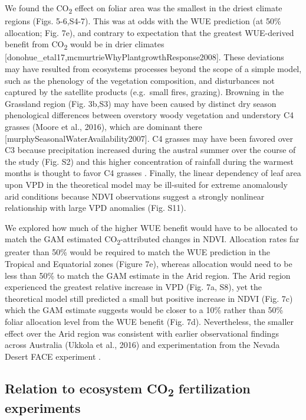 \documentclass[gc, manuscript]{copernicus}
\begin{document}
We found the CO\textsubscript{2} effect on foliar area was the smallest
in the driest climate regions (Figs. 5-6,S4-7). This was at odds with
the WUE prediction (at 50\% allocation; Fig. 7e), and contrary to
expectation that the greatest WUE-derived benefit from
CO\textsubscript{2} would be in drier climates
{[}donohue\_etal17,mcmurtrieWhyPlantgrowthResponse2008{]}. These
deviations may have resulted from ecosystems processes beyond the scope
of a simple model, such as the phenology of the vegetation composition,
and disturbances not captured by the satellite products (e.g.~small
fires, grazing). Browning in the Grassland region (Fig. 3b,S3) may have
been caused by distinct dry season phenological differences between
overstory woody vegetation and understory C4 grasses
\citep{mooreReviewsSynthesesAustralian2016}(Moore et al., 2016), which
are dominant there {[}murphySeasonalWaterAvailability2007{]}. C4 grasses
may have been favored over C3 because precipitation increased during the
austral summer over the course of the study (Fig. S2) and this higher
concentration of rainfall during the warmest months is thought to favor
C4 grasses
\citep{hattersleyDistributionC3C41983a, knappResolvingDustBowl2020, murphySeasonalWaterAvailability2007}.
Finally, the linear dependency of leaf area upon VPD in the theoretical
model may be ill-suited for extreme anomalously arid conditions because
NDVI observations suggest a strongly nonlinear relationship with large
VPD anomalies (Fig. S11).

We explored how much of the higher WUE benefit would have to be
allocated to match the GAM estimated CO\textsubscript{2}-attributed
changes in NDVI. Allocation rates far greater than 50\% would be
required to match the WUE prediction in the Tropical and Equatorial
zones (Figure 7e), whereas allocation would need to be less than 50\% to
match the GAM estimate in the Arid region. The Arid region experienced
the greatest relative increase in VPD (Fig. 7a, S8), yet the theoretical
model still predicted a small but positive increase in NDVI (Fig. 7c)
which the GAM estimate suggests would be closer to a 10\% rather than
50\% foliar allocation level from the WUE benefit (Fig. 7d).
Nevertheless, the smaller effect over the Arid region was consistent
with earlier observational findings across Australia
\citep{ukkolaReducedStreamflowWaterstressed2016b}(Ukkola et al., 2016)
and experimentation from the Nevada Desert FACE experiment
\citep{smithLongtermResponseMojave2014}.

\subsection{\texorpdfstring{Relation to ecosystem CO\textsubscript{2}
fertilization
experiments}{Relation to ecosystem CO2 fertilization experiments}}
\end{document}
